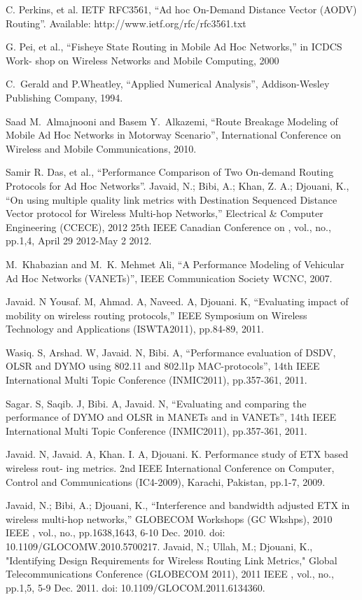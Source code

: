 \documentclass[journal]{IEEEtran}
\begin{document}
\begin{thebibliography}{00}

 C. Perkins, et al. IETF RFC3561, ``Ad hoc On-Demand Distance Vector (AODV) Routing''. Available: http://www.ietf.org/rfc/rfc3561.txt

	G. Pei, et al., ``Fisheye State Routing in Mobile Ad Hoc Networks,'' in ICDCS Work- shop on Wireless Networks and Mobile Computing, 2000

C.~Gerald and P.Wheatley, ``Applied Numerical Analysis'', Addison-Wesley Publishing Company, 1994.

Saad M.~Almajnooni and Basem Y.~Alkazemi, ``Route Breakage Modeling of Mobile Ad Hoc Networks in Motorway Scenario'', International Conference on Wireless and Mobile Communications, 2010.

Samir R. Das, et al., ``Performance Comparison of Two On-demand Routing Protocols for Ad Hoc Networks''.
Javaid, N.; Bibi, A.; Khan, Z. A.; Djouani, K., ``On using multiple quality link metrics with Destination Sequenced Distance Vector protocol for Wireless Multi-hop Networks,'' Electrical \& Computer Engineering (CCECE), 2012 25th IEEE Canadian Conference on , vol., no., pp.1,4, April 29 2012-May 2 2012.

 M.~Khabazian and M.~K. Mehmet Ali, ``A Performance Modeling of Vehicular Ad Hoc Networks (VANETs)'', IEEE Communication Society WCNC, 2007.

 Javaid. N Yousaf. M, Ahmad. A, Naveed. A, Djouani. K, ``Evaluating impact of mobility on wireless routing protocols,'' IEEE Symposium on Wireless Technology and Applications (ISWTA2011), pp.84-89, 2011.

 Wasiq. S, Arshad. W, Javaid. N, Bibi. A, ``Performance evaluation of DSDV, OLSR and DYMO using 802.11 and 802.l1p MAC-protocols'', 14th IEEE International Multi Topic Conference (INMIC2011), pp.357-361, 2011.

 Sagar. S, Saqib. J, Bibi. A, Javaid. N, ``Evaluating and comparing the performance of DYMO and OLSR in MANETs and in VANETs'', 14th IEEE International Multi Topic Conference (INMIC2011), pp.357-361, 2011.

Javaid. N, Javaid. A, Khan. I. A, Djouani. K. Performance study of ETX based wireless rout- ing metrics. 2nd IEEE International Conference on Computer, Control and Communications (IC4-2009), Karachi, Pakistan, pp.1-7, 2009.

Javaid, N.; Bibi, A.; Djouani, K., ``Interference and bandwidth adjusted ETX in wireless multi-hop networks,'' GLOBECOM Workshops (GC Wkshps), 2010 IEEE , vol., no., pp.1638,1643, 6-10 Dec. 2010. doi: 10.1109/GLOCOMW.2010.5700217.
Javaid, N.; Ullah, M.; Djouani, K., "Identifying Design Requirements for Wireless Routing Link Metrics," Global Telecommunications Conference (GLOBECOM 2011), 2011 IEEE , vol., no., pp.1,5, 5-9 Dec. 2011. doi: 10.1109/GLOCOM.2011.6134360.

\end{thebibliography}
\end{document}
